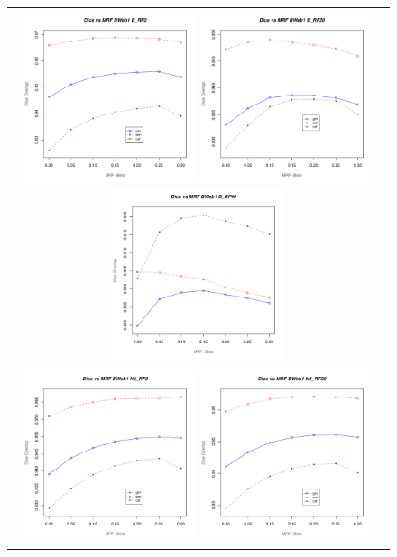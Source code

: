 \documentclass[11pt,english]{article}
\begin{document}
\begin{figure}
\begin{center}
\begin{tabular}{c}
\includegraphics[height=2in]{Figures/tissue_dice_vs_mrf_B_RF0.pdf}
\includegraphics[height=2in]{Figures/tissue_dice_vs_mrf_B_RF20.pdf}
\includegraphics[height=2in]{Figures/tissue_dice_vs_mrf_B_RF40.pdf}\\
\includegraphics[height=2in]{Figures/tissue_dice_vs_mrf_N4_RF0.pdf}
\includegraphics[height=2in]{Figures/tissue_dice_vs_mrf_N4_RF20.pdf}

\end{tabular}
\end{center}
\end{figure}
\end{document}
